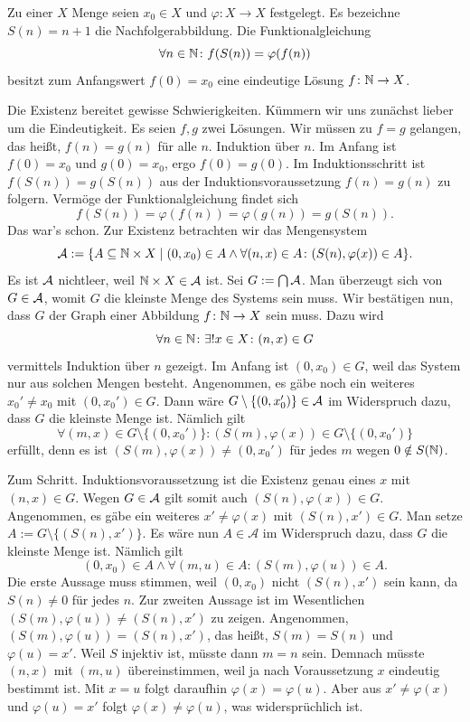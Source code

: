 \begin{Satz}%
\newlinefirst
Zu einer $X$ Menge seien $x_0\in X$ und $\varphi\colon X\to X$
festgelegt. Es bezeichne $S(n)=n+1$ die Nachfolgerabbildung. Die
Funktionalgleichung
\[\forall n\in\mathbb N\colon f(S(n)) = \varphi(f(n))\]
besitzt zum Anfangswert $f(0)=x_0$ eine eindeutige Lösung
$f\colon\mathbb N\to X$.
\end{Satz}
\begin{Beweis}[Beweis]
Die Existenz bereitet gewisse Schwierigkeiten. Kümmern wir uns
zunächst lieber um die Eindeutigkeit. Es seien $f,g$ zwei Lösungen.
Wir müssen zu $f=g$ gelangen, das heißt, $f(n)=g(n)$ für alle $n$.
Induktion über $n$. Im Anfang ist $f(0)=x_0$ und $g(0)=x_0$, ergo
$f(0)=g(0)$. Im Induktionsschritt ist $f(S(n))=g(S(n))$ aus der
Induktionsvoraussetzung $f(n)=g(n)$ zu folgern. Vermöge der
Funktionalgleichung findet sich
\[f(S(n)) = \varphi(f(n)) = \varphi(g(n)) = g(S(n)).\]
Das war's schon. Zur Existenz betrachten wir das Mengensystem
\[\mathcal{A} := \{A\subseteq\mathbb N\times X\mid (0,x_0)\in A\land
\forall (n,x)\in A\colon (S(n),\varphi(x))\in A\}.\]
Es ist $\mathcal{A}$ nichtleer, weil $\mathbb N\times X\in\mathcal{A}$ ist.
Sei $G:=\bigcap\mathcal{A}$. Man überzeugt sich von $G\in\mathcal{A}$,
womit $G$ die kleinste Menge des Systems sein muss. Wir bestätigen
nun, dass $G$ der Graph einer Abbildung $f\colon\mathbb N\to X$ sein muss. Dazu
wird
\[\forall n\in\mathbb N\colon\exists! x\in X\colon (n,x)\in G\]
vermittels Induktion über $n$ gezeigt. Im Anfang ist $(0,x_0)\in G$,
weil das System nur aus solchen Mengen besteht. Angenommen, es gäbe
noch ein weiteres $x_0'\ne x_0$ mit $(0,x_0')\in G$. Dann wäre
$G\setminus\{(0,x_0')\}\in\mathcal{A}$ im Widerspruch dazu, dass $G$
die kleinste Menge ist. Nämlich gilt
\[\forall (m,x)\in G\setminus\{(0,x_0')\}\colon
(S(m),\varphi(x))\in G\setminus\{(0,x_0')\}\]
erfüllt, denn es ist $(S(m),\varphi(x))\ne (0,x_0')$ für jedes $m$
wegen $0\notin S(\mathbb N)$.

Zum Schritt. Induktionsvoraussetzung ist die Existenz genau eines $x$
mit $(n,x)\in G$. Wegen $G\in\mathcal{A}$ gilt somit auch
$(S(n),\varphi(x))\in G$. Angenommen, es gäbe ein weiteres
$x'\ne\varphi(x)$ mit $(S(n),x')\in G$. Man setze
$A:=G\setminus\{(S(n),x')\}$. Es wäre nun $A\in\mathcal A$ im
Widerspruch dazu, dass $G$ die kleinste Menge ist. Nämlich gilt
\[(0,x_0)\in A\land\forall (m,u)\in A\colon (S(m),\varphi(u))\in A.\]
Die erste Aussage muss stimmen, weil $(0,x_0)$ nicht $(S(n),x')$ sein kann,
da $S(n)\ne 0$ für jedes $n$. Zur zweiten Aussage ist im Wesentlichen
$(S(m),\varphi(u))\ne (S(n),x')$ zu zeigen.
Angenommen, $(S(m),\varphi(u)) = (S(n),x')$, das heißt,
$S(m)=S(n)$ und $\varphi(u)=x'$. Weil $S$ injektiv ist, müsste dann
$m=n$ sein. Demnach müsste $(n,x)$ mit $(m,u)$ übereinstimmen, weil ja
nach Voraussetzung $x$ eindeutig bestimmt ist. Mit $x=u$ folgt daraufhin
$\varphi(x)=\varphi(u)$. Aber aus $x'\ne\varphi(x)$ und $\varphi(u)=x'$
folgt $\varphi(x)\ne\varphi(u)$, was widersprüchlich ist.


\end{Beweis}
